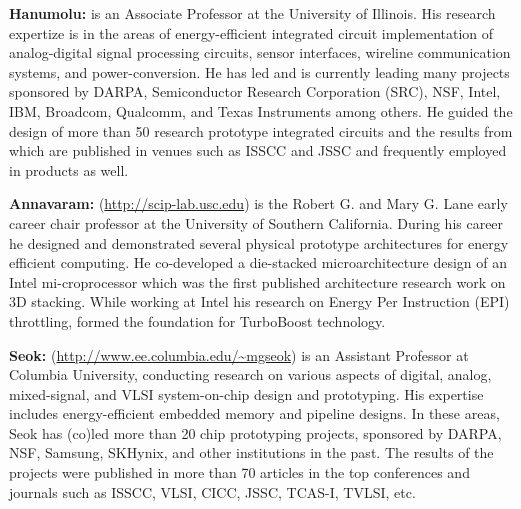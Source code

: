 \vspace{3pt}
\noindent
\textbf{Hanumolu:} is an Associate Professor at the University of Illinois. 
His research expertize is in the areas of energy-efficient integrated circuit implementation of analog-digital signal processing circuits, sensor interfaces, wireline communication systems, and power-conversion. 
He has led and is currently leading many projects sponsored by DARPA, Semiconductor Research Corporation (SRC), NSF, Intel, IBM, Broadcom, Qualcomm, and Texas Instruments among others. 
He guided the design of more than 50 research prototype integrated circuits and the results from which are published in venues such as ISSCC and JSSC and frequently employed in products as well.   

\vspace{3pt}
\noindent
\textbf{Annavaram:} (\url{http://scip-lab.usc.edu}) is the Robert G. and Mary G. Lane early career chair professor at the University of Southern California. 
During his career he designed and demonstrated several physical prototype architectures for energy efficient computing. 
He co-developed a die-stacked microarchitecture design of an Intel mi-croprocessor which was the first published architecture research work on 3D stacking. 
While working at Intel his research on Energy Per Instruction (EPI) throttling, formed the foundation for TurboBoost technology.

\vspace{3pt}
\noindent
\textbf{Seok:} (\url{http://www.ee.columbia.edu/~mgseok}) is an Assistant Professor at Columbia University, conducting research on various aspects of digital, analog, mixed-signal, and VLSI system-on-chip design and prototyping. 
His expertise includes energy-efficient embedded memory and pipeline designs. 
In these areas, Seok has (co)led more than 20 chip prototyping projects, sponsored by DARPA, NSF, Samsung, SKHynix, and other institutions in the past. 
The results of the projects were published in more than 70 articles in the top conferences and journals such as ISSCC, VLSI, CICC, JSSC, TCAS-I, TVLSI, etc.
